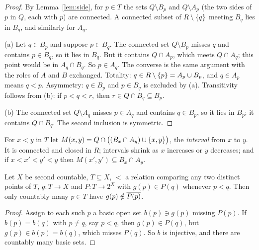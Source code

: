 \begin{proof}
By Lemma~\ref{lem:side}, for $p\in T$ the sets $Q\setminus B_p$ and $Q\setminus A_p$ (the two sides of $p$ in $Q$, each with $p$) are connected. A connected
subset of $R\setminus\left\{ q \right\}$ meeting $B_q$ lies in $B_q$, and similarly for $A_q$.

(a) Let $q\in B_p$ and suppose $p\in B_q$. The connected set $Q\setminus B_p$ misses $q$ and contains $p\in B_q$, so it lies in $B_q$. But it contains $Q\cap
A_p$, which meets $Q\cap A_q$; this point would be in $A_q\cap B_q$. So $p\in A_q$. The converse is the same argument with the roles of $A$ and $B$
exchanged. Totality: $q\in R\setminus\left\{ p \right\}=A_p\cup B_p$, and $q\in A_p$ means $q<p$. Asymmetry: $q\in B_p$ and $p\in B_q$ is excluded by (a). Transitivity
follows from (b): if $p<q<r$, then $r\in Q\cap B_q\subseteq B_p$.

(b) The connected set $Q\setminus A_q$ misses $p\in A_q$ and contains $q\in B_p$, so it lies in $B_p$; it contains $Q\cap B_q$. The second inclusion is
symmetric.
\end{proof}


For $x<y$ in $T$ let $M(x,y)=Q\cap\bigl((B_x\cap A_y)\cup\left\{ x,y \right\}\bigr)$, the \emph{interval} from $x$ to $y$. It is connected and closed in $R$;
intervals shrink as $x$ increases or $y$ decreases; and if $x<x'<y'<y$ then $M(x',y')\subseteq B_x\cap A_y$.


\begin{lemma}\label{lem:counting}
Let $X$ be second countable, $T\subseteq X$, $<$ a relation comparing any two distinct points of $T$, $g\colon T\to X$ and $P\colon T\to 2^X$ with
$g(p)\in P(q)$ whenever $p<q$. Then only countably many $p\in T$ have $g(p)\notin\overline{P(p)}$.
\end{lemma}

\begin{proof}
Assign to each such $p$ a basic open set $b(p)\ni g(p)$ missing $P(p)$. If $b(p)=b(q)$ with $p\ne q$, say $p<q$, then $g(p)\in P(q)$, but $g(p)\in b(p)=b(q)$,
which misses $P(q)$. So $b$ is injective, and there are countably many basic sets.
\end{proof}

